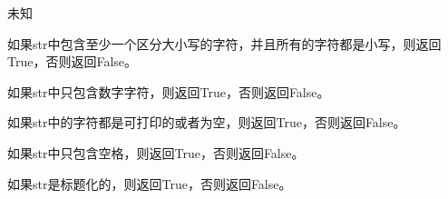 \noindent{\color{red}{str.isidentifier():}}
\par{未知}\\

\noindent{\color{red}{str.islower():}}
\par{如果str中包含至少一个区分大小写的字符，并且所有的字符都是小写，则返回True，否则返回False。}\\

\noindent{\color{red}{str.isnumeric():}}
\par{如果str中只包含数字字符，则返回True，否则返回False。}\\

\noindent{\color{red}{str.isprintable():}}
\par{如果str中的字符都是可打印的或者为空，则返回True，否则返回False。}\\

\noindent{\color{red}{str.isspace():}}
\par{如果str中只包含空格，则返回True，否则返回False。}\\

\noindent{\color{red}{str.istitle():}}
\par{如果str是标题化的，则返回True，否则返回False。}\\


